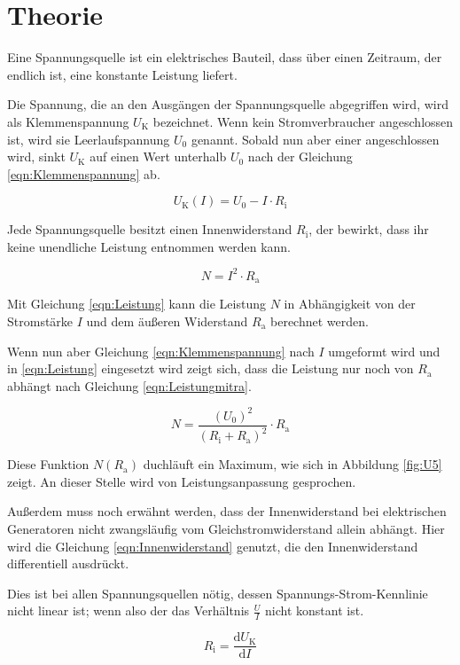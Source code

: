 \section{Theorie}
\label{sec:Theorie}

Eine Spannungsquelle ist ein elektrisches Bauteil, dass über einen Zeitraum, der endlich ist,
eine konstante Leistung liefert.

Die Spannung, die an den Ausgängen der Spannungsquelle abgegriffen wird, wird
als Klemmenspannung $U_\text{K}$ bezeichnet. Wenn kein Stromverbraucher angeschlossen ist, wird
sie Leerlaufspannung $U_\text{0}$ genannt. Sobald nun aber einer
angeschlossen wird, sinkt $U_\text{K}$ auf einen Wert unterhalb $U_\text{0}$ nach der Gleichung
\eqref{eqn:Klemmenspannung} ab.

\begin{equation}
  U_\text{K}(I) = U_\text{0} - I \cdot R_\text{i}
  \label{eqn:Klemmenspannung}
\end{equation}

Jede Spannungsquelle besitzt einen Innenwiderstand $R_\text{i}$, der bewirkt, dass
ihr keine unendliche Leistung entnommen werden kann.

\begin{equation}
  N = I^2 \cdot R_\text{a}
  \label{eqn:Leistung}
\end{equation}

Mit Gleichung \eqref{eqn:Leistung} kann die Leistung $N$ in Abhängigkeit von der Stromstärke $I$
und dem äußeren Widerstand $R_\text{a}$ berechnet werden.

Wenn nun aber Gleichung
\eqref{eqn:Klemmenspannung} nach $I$ umgeformt wird und in \eqref{eqn:Leistung} eingesetzt wird
zeigt sich, dass die Leistung nur noch von $R_\text{a}$ abhängt nach Gleichung
\eqref{eqn:Leistungmitra}.

\begin{equation}
  N = \frac{(U_\text{0})^2}{(R_\text{i} + R_\text{a})^2} \cdot R_\text{a}
  \label{eqn:Leistungmitra}
\end{equation}

Diese Funktion $N(R_\text{a})$ duchläuft ein Maximum, wie sich in Abbildung
\ref{fig:U5} zeigt. An dieser Stelle wird von Leistungsanpassung gesprochen.

Außerdem muss noch erwähnt werden, dass der Innenwiderstand bei elektrischen
Generatoren nicht zwangsläufig vom Gleichstromwiderstand allein abhängt. Hier
wird die Gleichung \eqref{eqn:Innenwiderstand} genutzt, die den Innenwiderstand
differentiell ausdrückt.

Dies ist bei allen Spannungsquellen nötig, dessen Spannungs-Strom-Kennlinie
nicht linear ist; wenn also der das Verhältnis $\frac{U}{I}$ nicht konstant ist.

\begin{equation}
  R_\text{i} = \frac{\text{d}U_\text{K}}{\text{d}I}
  \label{eqn:Innenwiderstand}
\end{equation}

\newpage

